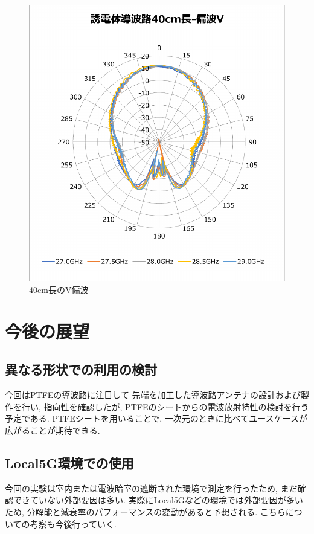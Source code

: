 \documentclass[technicalreport]{ieicej}
\begin{document}
\begin{figure}[tb]
  \begin{center}
    \includegraphics[bb=0 0 408 430, width=0.9\linewidth]{img/waveguide-40cm-v.pdf}
    \caption{40cm長のV偏波}
    \label{fig:40cm-v}
  \end{center}
\end{figure}

\section{今後の展望}

\subsection{異なる形状での利用の検討}

今回はPTFEの導波路に注目して
先端を加工した導波路アンテナの設計および製作を行い,
指向性を確認したが,
PTFEのシートからの電波放射特性の検討を行う予定である.
PTFEシートを用いることで,
一次元のときに比べてユースケースが広がることが期待できる.

\subsection{Local5G環境での使用}

今回の実験は室内または電波暗室の遮断された環境で測定を行ったため,
まだ確認できていない外部要因は多い.
実際にLocal5Gなどの環境では外部要因が多いため,
分解能と減衰率のパフォーマンスの変動があると予想される.
こちらについての考察も今後行っていく.
\end{document}

